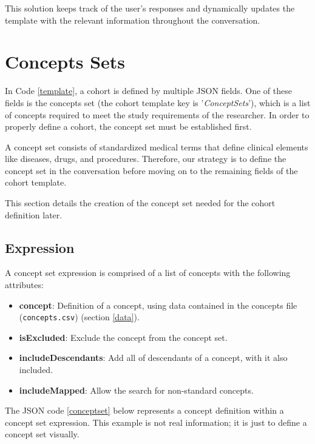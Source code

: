 This solution keeps track of the user's responses and dynamically updates the template with the relevant information throughout the conversation.


\section{Concepts Sets}

In Code \ref{template}, a cohort is defined by multiple JSON fields. One of these fields is the concepts set (the cohort template key is '\textit{ConceptSets}'), which is a list of concepts required to meet the study requirements of the researcher. In order to properly define a cohort, the concept set must be established first. 

A concept set consists of standardized medical terms that define clinical elements like diseases, drugs, and procedures\cite{informatics_chapter_nodate}. Therefore, our strategy is to define the concept set in the conversation before moving on to the remaining fields of the cohort template.

This section details the creation of the concept set needed for the cohort definition later.


\subsection{Expression}
A concept set expression is comprised of a list of concepts with the following attributes:

\begin{itemize}
  \item \textbf{concept}: Definition of a concept, using data contained in the concepts file  {\small\normalfont(\texttt{concepts.csv})} (section \ref{data}).
  \item \textbf{isExcluded}: Exclude the concept from the concept set.
  \item \textbf{includeDescendants}: Add all of descendants of a concept, with it also included.
  \item \textbf{includeMapped}: Allow the search for non-standard concepts.
\end{itemize}


The JSON code \ref{conceptset} below represents a concept definition within a concept set expression. This example is not real information; it is just to define a concept set visually.

